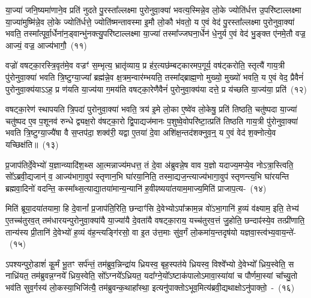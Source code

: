 या॒ज्या॑ जनि॒ष्यमा॑णाने॒व प्रति॑ नुदते पु॒रस्ता᳚ल्लक्ष्मा पुरोनुवा॒क्या॑ भवत्य॒स्मिन्ने॒व लो॒के ज्योति॑र्धत्त उ॒परि॑ष्टाल्लक्ष्मा या॒ज्या॑मुष्मि॑न्ने॒व लो॒के ज्योति॑र्धत्ते॒ ज्योति॑ष्मन्तावस्मा इ॒मौ लो॒कौ भ॑वतो॒ य ए॒वं वेद॑ पु॒रस्ता᳚ल्लक्ष्मा पुरोनुवा॒क्या॑ भवति॒ तस्मा᳚त्पूर्वा॒र्धेना॑न॒ड्वान्भु॑नक्त्यु॒परि॑ष्टाल्लक्ष्मा या॒ज्या॑ तस्मा᳚ज्जघना॒र्धेन॑ धे॒नुर्य ए॒वं वेद॑ भु॒ङ्क्त ए॑नमे॒तौ वज्र॒ आज्यं॒ वज्र॒ आज्य॑भागौ॒~(११)\ip

वज्रो॑ वषट्का॒रस्त्रि॒वृत॑मे॒व वज्रꣳ॑ स॒म्भृत्य॒ भ्रातृ॑व्याय॒ प्र ह॑र॒त्यछ॑म्बट्कारमप॒गूर्य॒ वष॑ट्करोति॒ स्तृत्यै॑ गाय॒त्री पु॑रोनुवा॒क्या॑ भवति त्रि॒ष्टुग्या॒ज्या᳚ ब्रह्म॑न्ने॒व क्ष॒त्रम॒न्वार॑म्भयति॒ तस्मा᳚द्\-ब्राह्म॒णो मुख्यो॒ मुख्यो॑ भवति॒ य ए॒वं वेद॒ प्रैवैनं॑ पुरोनुवा॒क्य॑या\-ऽऽ\-ह॒ प्र ण॑यति या॒ज्य॑या ग॒मय॑ति वषट्का॒रेणैवैनं॑ पुरोनुवा॒क्य॑या दत्ते॒ प्र य॑च्छति या॒ज्य॑या॒ प्रति॑~(१२)\ip

वषट्का॒रेण॑ स्थापयति त्रि॒पदा॑ पुरोनुवा॒क्या॑ भवति॒ त्रय॑ इ॒मे लो॒का ए॒ष्वे॑व लो॒केषु॒ प्रति॑ तिष्ठति॒ चतु॑ष्पदा या॒ज्या॑ चतु॑ष्पद ए॒व प॒शूनव॑ रुन्धे द्व्यक्ष॒रो व॑षट्का॒रो द्वि॒पाद्यज॑मानः प॒शुष्वे॒वोपरि॑ष्टा॒त्प्रति॑ तिष्ठति गाय॒त्री पु॑रोनुवा॒क्या॑ भवति त्रि॒ष्टुग्या॒ज्यै॑षा वै स॒प्तप॑दा॒ शक्व॑री॒ यद्वा ए॒तया॑ दे॒वा अशि॑क्ष॒न्तद॑शक्नुव॒न्॒ य ए॒वं वेद॑ श॒क्नोत्ये॒व यच्छिक्ष॑ति॥~(१३)\ip

{\anuvakamend[{दे॒वता॑नाङ्करोत्यु॒परि॑ष्टाल्ल॒क्ष्मा\-ऽऽ\-ज्य॑भागौ॒ प्रति॑ श॒क्नोत्ये॒व द्वे च॑}]}

प्र॒जा\-प॑तिर्दे॒वेभ्यो॑ य॒ज्ञान्व्यादि॑श॒थ्स आ॒त्मन्नाज्य॑\-मधत्त॒ तं दे॒वा अ॑ब्रुवन्ने॒ष वाव य॒ज्ञो यदाज्य॒मप्ये॒व नो\-ऽत्रा॒स्त्विति॒ सो᳚\-ऽब्रवी॒द्यजान्॑ व॒ आज्य॑\-भागा॒वुप॑ स्तृणान॒भि घा॑रया॒निति॒ तस्मा॒द्\-यज॒न्त्याज्य॑\-भागा॒वुप॑ स्तृणन्त्य॒भि घा॑रयन्ति ब्रह्मवा॒दिनो॑ वदन्ति॒ कस्मा᳚थ्स॒त्याद्या॒तया॑\-मान्य॒न्यानि॑ ह॒वीꣴष्यया॑त\-याम॒माज्य॒\-मिति॑ प्राजाप॒त्य-~(१४)\ip

मिति॑ ब्रूया॒दया॑तयामा॒ हि दे॒वानां᳚ प्र॒जा\-प॑ति॒रिति॒ छन्दाꣳ॑सि दे॒वेभ्यो\-ऽपा᳚क्राम॒न्न वो॑\-ऽभा॒गानि॑ ह॒व्यं व॑क्ष्याम॒ इति॒ तेभ्य॑ ए॒तच्च॑तुरव॒त् तम॑धारयन्पुरोनुवा॒क्या॑यै या॒ज्या॑यै दे॒वता॑यै वषट्का॒राय॒ यच्च॑तुरव॒त्तं जु॒होति॒ छन्दाꣴ॑स्ये॒व तत्प्री॑णाति॒ तान्य॑स्य प्री॒तानि॑ दे॒वेभ्यो॑ ह॒व्यं व॑ह॒न्त्यङ्गि॑रसो॒ वा इ॒त उ॑त्त॒माः सु॑व॒र्गं लो॒कमा॑य॒न्तदृष॑यो यज्ञवा॒स्त्व॑भ्य॒वाय॒न्ते॑-~(१५)\ip

ऽपश्यन्पुरो॒डाशं॑ कू॒र्मं भू॒तꣳ सर्प॑न्तं॒ तम॑ब्रुव॒न्निन्द्रा॑य ध्रियस्व॒ बृह॒स्पत॑ये ध्रियस्व॒ विश्वे᳚भ्यो दे॒वेभ्यो᳚ ध्रिय॒स्वेति॒ स नाध्रि॑यत॒ तम॑ब्रुवन्न॒ग्नये᳚ ध्रिय॒स्वेति॒ सो᳚\-ऽग्नये᳚\-ऽध्रियत॒ यदा᳚ग्ने॒यो᳚\-ऽष्टाक॑पालो\-ऽमावा॒स्या॑यां च पौर्णमा॒स्यां चा᳚च्यु॒तो भव॑ति सुव॒र्गस्य॑ लो॒कस्या॒भिजि॑त्यै॒ तम॑ब्रुवन्क॒थाहा᳚स्था॒ इत्यनु॑पाक्तो\-ऽभूव॒मित्य॑ब्रवी॒द्यथाक्षो\-ऽनु॑पाक्तो॒~-~(१६)\ip

